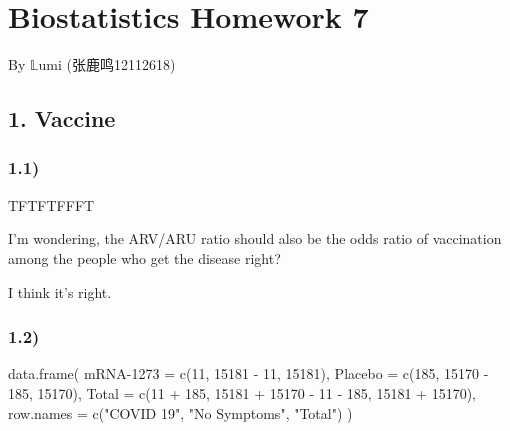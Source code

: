 \documentclass[
]{article}
\author{}
\date{\vspace{-2.5em}}
\newenvironment{Shaded}{\begin{snugshade}}{\end{snugshade}}
\newcommand{\AttributeTok}[1]{\textcolor[rgb]{0.77,0.63,0.00}{#1}}
\newcommand{\DecValTok}[1]{\textcolor[rgb]{0.00,0.00,0.81}{#1}}
\newcommand{\FunctionTok}[1]{\textcolor[rgb]{0.00,0.00,0.00}{#1}}
\newcommand{\NormalTok}[1]{#1}
\newcommand{\OtherTok}[1]{\textcolor[rgb]{0.56,0.35,0.01}{#1}}
\newcommand{\SpecialCharTok}[1]{\textcolor[rgb]{0.00,0.00,0.00}{#1}}
\newcommand{\StringTok}[1]{\textcolor[rgb]{0.31,0.60,0.02}{#1}}
\begin{document}
\hypertarget{biostatistics-homework-7}{%
\section{Biostatistics Homework 7}\label{biostatistics-homework-7}}

By \(\mathbb{L}\)umi (张鹿鸣12112618)

\vspace{5mm}

\hypertarget{vaccine}{%
\subsection{1. Vaccine}\label{vaccine}}

\hypertarget{section}{%
\subsubsection{1.1)}\label{section}}

TFTFTFFFT

I'm wondering, the ARV/ARU ratio should also be the odds ratio of
vaccination among the people who get the disease right?

I think it's right.

\hypertarget{section-1}{%
\subsubsection{1.2)}\label{section-1}}

\begin{Shaded}
\begin{Highlighting}[]
\FunctionTok{data.frame}\NormalTok{(}
  \StringTok{\textasciigrave{}}\AttributeTok{mRNA{-}1273}\StringTok{\textasciigrave{}} \OtherTok{=} \FunctionTok{c}\NormalTok{(}\DecValTok{11}\NormalTok{, }\DecValTok{15181} \SpecialCharTok{{-}} \DecValTok{11}\NormalTok{, }\DecValTok{15181}\NormalTok{),}
  \AttributeTok{Placebo =} \FunctionTok{c}\NormalTok{(}\DecValTok{185}\NormalTok{, }\DecValTok{15170} \SpecialCharTok{{-}} \DecValTok{185}\NormalTok{, }\DecValTok{15170}\NormalTok{),}
  \AttributeTok{Total =} \FunctionTok{c}\NormalTok{(}\DecValTok{11} \SpecialCharTok{+} \DecValTok{185}\NormalTok{, }\DecValTok{15181} \SpecialCharTok{+} \DecValTok{15170} \SpecialCharTok{{-}} \DecValTok{11} \SpecialCharTok{{-}} \DecValTok{185}\NormalTok{, }\DecValTok{15181} \SpecialCharTok{+} \DecValTok{15170}\NormalTok{),}
  \AttributeTok{row.names =} \FunctionTok{c}\NormalTok{(}\StringTok{"COVID 19"}\NormalTok{, }\StringTok{"No Symptoms"}\NormalTok{, }\StringTok{"Total"}\NormalTok{)}
\NormalTok{)}
\end{Highlighting}
\end{Shaded}
\end{document}
